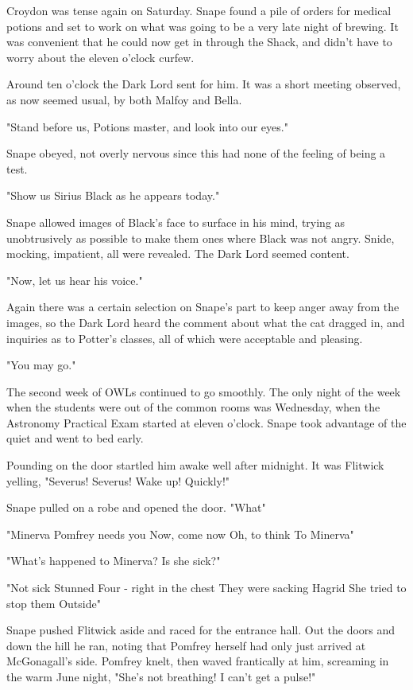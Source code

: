 Croydon was tense again on Saturday. Snape found a pile of orders for medical potions and set to work on what was going to be a very late night of brewing. It was convenient that he could now get in through the Shack, and didn't have to worry about the eleven o'clock curfew.

Around ten o'clock the Dark Lord sent for him. It was a short meeting observed, as now seemed usual, by both Malfoy and Bella.

"Stand before us, Potions master, and look into our eyes."

Snape obeyed, not overly nervous since this had none of the feeling of being a test.

"Show us Sirius Black as he appears today."

Snape allowed images of Black's face to surface in his mind, trying as unobtrusively as possible to make them ones where Black was not angry. Snide, mocking, impatient, all were revealed. The Dark Lord seemed content.

"Now, let us hear his voice."

Again there was a certain selection on Snape's part to keep anger away from the images, so the Dark Lord heard the comment about what the cat dragged in, and inquiries as to Potter's classes, all of which were acceptable and pleasing.

"You may go."

The second week of OWLs continued to go smoothly. The only night of the week when the students were out of the common rooms was Wednesday, when the Astronomy Practical Exam started at eleven o'clock. Snape took advantage of the quiet and went to bed early.

Pounding on the door startled him awake well after midnight. It was Flitwick yelling, "Severus! Severus! Wake up! Quickly!"

Snape pulled on a robe and opened the door. "What{\el}"

"Minerva{\el} Pomfrey needs you{\el} Now, come now{\el} Oh, to think{\el} To Minerva{\el}"

"What's happened to Minerva? Is she sick?"

"Not sick{\el} Stunned{\el} Four - right in the chest{\el} They were sacking Hagrid{\el} She tried to stop them{\el} Outside{\el}"

Snape pushed Flitwick aside and raced for the entrance hall. Out the doors and down the hill he ran, noting that Pomfrey herself had only just arrived at McGonagall's side. Pomfrey knelt, then waved frantically at him, screaming in the warm June night, "She's not breathing! I can't get a pulse!"

